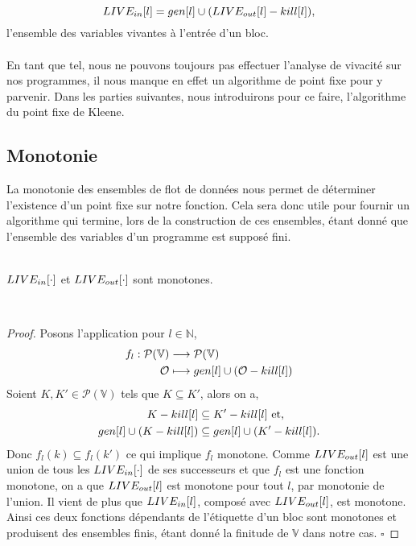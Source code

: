 \documentclass[a4paper, 12pt]{article}
\begin{document}
\[
	LIVE_{in}[l] = gen[l] \cup (LIVE_{out}[l] - kill[l]),
\]
l'ensemble des variables vivantes à l'entrée d'un bloc.
\\
\\
En tant que tel, nous ne pouvons toujours pas effectuer l'analyse de vivacité sur nos programmes, il nous manque en
effet un algorithme de point fixe pour y parvenir. Dans les parties suivantes, nous introduirons pour ce faire, 
l'algorithme du point fixe de Kleene.

\subsection{Monotonie}
La monotonie des ensembles de flot de données nous permet de déterminer l'existence d'un point fixe sur notre
fonction. Cela sera donc utile pour fournir un algorithme qui termine, lors de la construction de ces ensembles, 
étant donné que l'ensemble des variables d'un programme est supposé fini.
\\
\\
\begin{lemma}
	$LIVE_{in}[\cdot]$ et $LIVE_{out}[\cdot]$ sont monotones.
\end{lemma}
\\
\begin{proof}	
Posons l'application pour $l \in \mathbb{N}$,
\begin{align*}
	f_l : \mathcal{P}(\mathbb{V}) &\longrightarrow \mathcal{P}(\mathbb{V}) \\
	\mathcal{O} &\longmapsto gen[l] \cup (\mathcal{O} - kill[l])
\end{align*}
Soient $K, K' \in \mathcal{P}(\mathbb{V})$ tels que $K \subseteq K'$, alors on a,
\begin{align*}
	K - kill[l] &\subseteq K' - kill[l] \text{ et,}\\
	gen[l] \cup (K - kill[l]) &\subseteq gen[l] \cup (K' - kill[l]).
\end{align*}
Donc $f_l(k) \subseteq f_l(k')$ ce qui implique $f_l$ monotone. Comme $LIVE_{out}[l]$ est une union de tous les $LIVE_{in}[\cdot]$
de ses successeurs et que $f_l$ est une fonction monotone, on a que $LIVE_{out}[l]$ est monotone pour tout $l$, par monotonie 
de l'union. Il vient de plus que $LIVE_{in}[l]$, composé avec $LIVE_{out}[l]$, est monotone.
Ainsi ces deux fonctions dépendants de l'étiquette d'un bloc sont monotones et produisent des ensembles finis, étant donné
la finitude de $\mathbb{V}$ dans notre cas.
\hfill$\square$
\end{proof}
\end{document}
